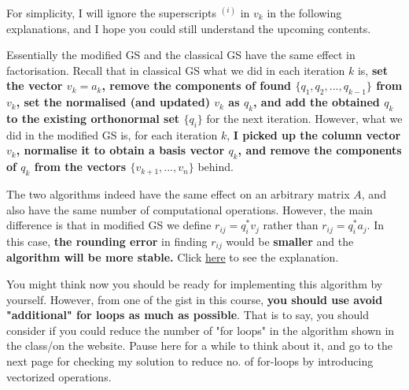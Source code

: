 \noindent For simplicity, I will ignore the superscripts \(^{(i)}\) in \(v_k\) in the following explanations, and I hope you could still understand the upcoming contents. \medskip

\noindent Essentially the modified GS and the classical GS have the same effect in factorisation. Recall that in classical GS what we did in each iteration \(k\) is, \textbf{set the vector \(v_k = a_k\), remove the components of found \(\{q_1, q_2, ..., q_{k - 1}\}\) from \(v_k\), set the normalised (and updated) \(v_k\) as \(q_k\), and add the obtained \(q_k\)  to the existing orthonormal set \(\{q_i\}\)} for the next iteration. However, what we did in the modified GS is, for each iteration \(k\), \textbf{I picked up the column vector \(v_k\), normalise it to obtain a basis vector \(q_k\), and remove the components of \(q_k\) from the vectors \(\{v_{k + 1}, ..., v_{n}\}\)} behind. \medskip

\noindent The two algorithms indeed have the same effect on an arbitrary matrix \(A\), and also have the same number of computational operations. However, the main difference is that in modified GS we define \(r_{ij} = q_i^{*}v_j\) rather than \(r_{ij} = q_i^{*}a_j\). In this case, \textbf{the rounding error} in finding \(r_{ij}\) would be \textbf{smaller} and the \textbf{algorithm will be more stable.} Click \href{https://math.stackexchange.com/questions/3913710/intuitive-explanation-of-why-the-modified-gram-schmidt-is-more-stable-than-the-c}{here} to see the explanation.\medskip

\noindent You might think now you should be ready for implementing this algorithm by yourself. However, from one of the gist in this course, \textbf{you should use avoid "additional" for loops as much as possible}. That is to say, you should consider if you could reduce the number of "for loops" in the algorithm shown in the class/on the website. Pause here for a while to think about it, and go to the next page for checking my solution to reduce no. of for-loops by introducing vectorized operations. 

